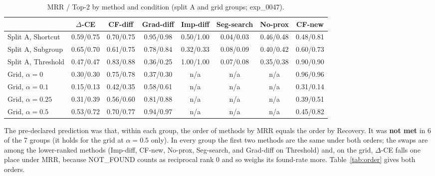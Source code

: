 \documentclass[10pt,a4paper]{article}
\theoremstyle{remark}
\newcommand{\DCE}{$\Delta$-CE}
\begin{document}
\begin{table}[h]
\caption{MRR / Top-2 by method and condition (split A and grid groups; exp\_0047).}\label{tab:rank}
\centering\scriptsize
\setlength{\tabcolsep}{3.5pt}
\begin{tabular}{lccccccc}
\toprule
 & $\Delta$-CE & CF-diff & Grad-diff & Imp-diff & Seg-search & No-prox & CF-new\\
\midrule
Split A, Shortcut & 0.59/0.75 & 0.70/0.75 & 0.95/0.98 & 0.50/1.00 & 0.04/0.03 & 0.46/0.48 & 0.48/0.81 \\
Split A, Subgroup & 0.65/0.70 & 0.61/0.75 & 0.78/0.84 & 0.32/0.33 & 0.08/0.09 & 0.40/0.42 & 0.60/0.73 \\
Split A, Threshold & 0.47/0.47 & 0.83/0.88 & 0.36/0.25 & 1.00/1.00 & 0.07/0.08 & 0.35/0.38 & 0.90/0.90 \\
Grid, $\alpha=0$ & 0.30/0.30 & 0.75/0.78 & 0.37/0.30 & n/a & n/a & n/a & 0.96/0.96 \\
Grid, $\alpha=0.1$ & 0.15/0.13 & 0.42/0.35 & 0.58/0.61 & n/a & n/a & n/a & 0.31/0.14 \\
Grid, $\alpha=0.25$ & 0.31/0.39 & 0.56/0.60 & 0.81/0.88 & n/a & n/a & n/a & 0.39/0.51 \\
Grid, $\alpha=0.5$ & 0.53/0.72 & 0.70/0.77 & 0.94/0.97 & n/a & n/a & n/a & 0.45/0.82 \\
\bottomrule
\end{tabular}
\end{table}

The pre-declared prediction was that, within each group, the order of methods by MRR equals the order by Recovery. It was \textbf{not met} in 6 of the 7 groups (it holds for the grid at $\alpha=0.5$ only). In every group the first two methods are the same under both orders; the swaps are among the lower-ranked methods (Imp-diff, CF-new, No-prox, Seg-search, and Grad-diff on Threshold) and, on the grid, \DCE{} falls one place under MRR, because NOT\_FOUND counts as reciprocal rank 0 and so weighs its found-rate more. Table~\ref{tab:order} gives both orders.
\end{document}

